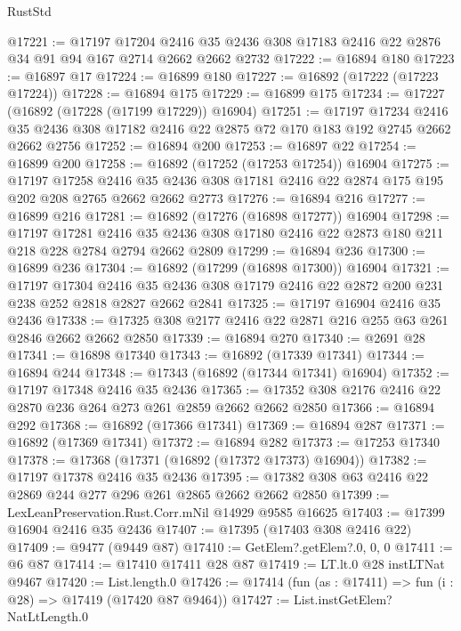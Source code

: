 \begin{lexlean}{RustStd}
\begin{coremodule}
@17221 := @17197
    @17204
    @2416
    @35
    @2436
    @308
    @17183
    @2416
    @22
    @2876
    @34
    @91
    @94
    @167
    @2714
    @2662
    @2662
    @2732
@17222 := @16894 @180
@17223 := @16897 @17
@17224 := @16899 @180
@17227 := @16892 (@17222 (@17223 @17224))
@17228 := @16894 @175
@17229 := @16899 @175
@17234 := @17227 (@16892 (@17228 (@17199 @17229)) @16904)
@17251 := @17197
    @17234
    @2416
    @35
    @2436
    @308
    @17182
    @2416
    @22
    @2875
    @72
    @170
    @183
    @192
    @2745
    @2662
    @2662
    @2756
@17252 := @16894 @200
@17253 := @16897 @22
@17254 := @16899 @200
@17258 := @16892 (@17252 (@17253 @17254)) @16904
@17275 := @17197
    @17258
    @2416
    @35
    @2436
    @308
    @17181
    @2416
    @22
    @2874
    @175
    @195
    @202
    @208
    @2765
    @2662
    @2662
    @2773
@17276 := @16894 @216
@17277 := @16899 @216
@17281 := @16892 (@17276 (@16898 @17277)) @16904
@17298 := @17197
    @17281
    @2416
    @35
    @2436
    @308
    @17180
    @2416
    @22
    @2873
    @180
    @211
    @218
    @228
    @2784
    @2794
    @2662
    @2809
@17299 := @16894 @236
@17300 := @16899 @236
@17304 := @16892 (@17299 (@16898 @17300)) @16904
@17321 := @17197
    @17304
    @2416
    @35
    @2436
    @308
    @17179
    @2416
    @22
    @2872
    @200
    @231
    @238
    @252
    @2818
    @2827
    @2662
    @2841
@17325 := @17197 @16904 @2416 @35 @2436
@17338 := @17325 @308 @2177 @2416 @22 @2871 @216 @255 @63 @261 @2846 @2662 @2662 @2850
@17339 := @16894 @270
@17340 := @2691 @28
@17341 := @16898 @17340
@17343 := @16892 (@17339 @17341)
@17344 := @16894 @244
@17348 := @17343 (@16892 (@17344 @17341) @16904)
@17352 := @17197 @17348 @2416 @35 @2436
@17365 := @17352 @308 @2176 @2416 @22 @2870 @236 @264 @273 @261 @2859 @2662 @2662 @2850
@17366 := @16894 @292
@17368 := @16892 (@17366 @17341)
@17369 := @16894 @287
@17371 := @16892 (@17369 @17341)
@17372 := @16894 @282
@17373 := @17253 @17340
@17378 := @17368 (@17371 (@16892 (@17372 @17373) @16904))
@17382 := @17197 @17378 @2416 @35 @2436
@17395 := @17382 @308 @63 @2416 @22 @2869 @244 @277 @296 @261 @2865 @2662 @2662 @2850
@17399 := LexLeanPreservation.Rust.Corr.mNil @14929 @9585 @16625
@17403 := @17399 @16904 @2416 @35 @2436
@17407 := @17395 (@17403 @308 @2416 @22)
@17409 := @9477 (@9449 @87)
@17410 := GetElem?.getElem?.{0, 0, 0}
@17411 := @6 @87
@17414 := @17410 @17411 @28 @87
@17419 := LT.lt.{0} @28 instLTNat @9467
@17420 := List.length.{0}
@17426 := @17414 (fun (as : @17411) => fun (i : @28) => @17419 (@17420 @87 @9464))
@17427 := List.instGetElem?NatLtLength.{0}

\end{coremodule}
\end{lexlean}
